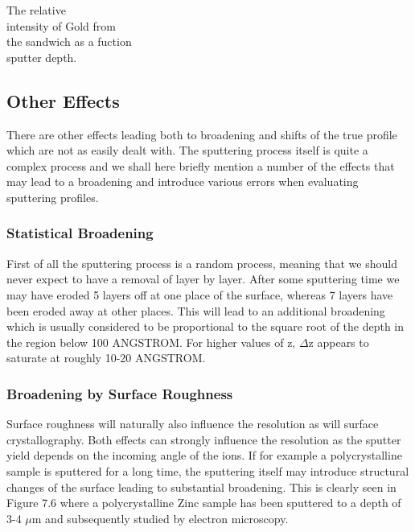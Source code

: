  \vspace{1cm}

  The relative\\ intensity of Gold
 from\\ the sandwich as a fuction\\ sputter depth.\\

 \vspace{8cm}



 \subsection{Other Effects}

 There are other effects leading both to broadening and
 shifts of the true profile which are not as easily dealt
 with. The sputtering process itself is quite a complex
 process and we shall here briefly mention a number of the
 effects that may lead to a broadening and introduce various
 errors when evaluating sputtering profiles.

 \subsubsection{Statistical Broadening}

 First of all the sputtering process is a random
 process, meaning that we should never expect to have a
 removal of layer by layer. After some sputtering time we may
 have eroded 5 layers off at one place of the surface,
 whereas 7 layers have been eroded away at other places. This
 will lead to an additional broadening which is usually
 considered to be proportional to the square root of the
 depth in the region below 100 ANGSTROM. For higher values of z,
 $\Delta$z appears to saturate at roughly 10-20 ANGSTROM.

 \subsubsection{Broadening by Surface Roughness}

 Surface roughness will naturally also influence the
 resolution as will surface crystallography. Both effects can
 strongly influence the resolution as the sputter yield
 depends on the incoming angle of the ions. If for example a
 polycrystalline sample is sputtered for a long time, the
 sputtering itself may introduce structural changes of the
 surface leading to substantial broadening. This is clearly
 seen in Figure 7.6 where a polycrystalline Zinc sample has
 been sputtered to a depth of 3-4 $\mu$m and subsequently
 studied by electron microscopy.

